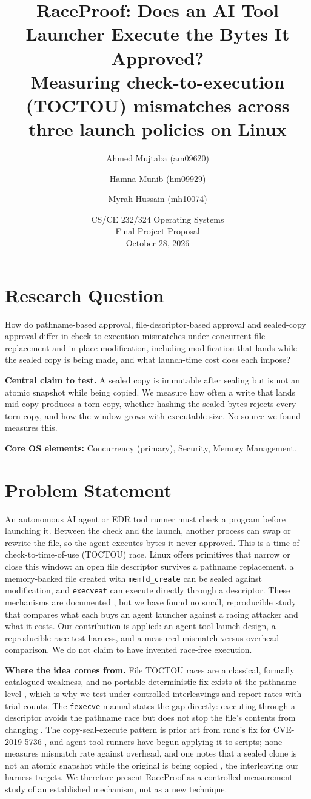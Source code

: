 \documentclass[11pt,a4paper]{article}
\title{\textbf{RaceProof: Does an AI Tool Launcher Execute the Bytes It Approved?}\\
\large Measuring check-to-execution (TOCTOU) mismatches across three launch policies on Linux}
\author{Ahmed Mujtaba (am09620) \and Hamna Munib (hm09929) \and Myrah Hussain (mh10074)}
\date{CS/CE 232/324 Operating Systems \\ Final Project Proposal \\ October 28, 2026}
\begin{document}
\maketitle

\section{Research Question}
How do pathname-based approval, file-descriptor-based approval and sealed-copy approval differ in check-to-execution mismatches under concurrent file replacement and in-place modification, including modification that lands while the sealed copy is being made, and what launch-time cost does each impose?

\textbf{Central claim to test.} A sealed copy is immutable after sealing but is not an atomic snapshot while being copied. We measure how often a write that lands mid-copy produces a torn copy, whether hashing the sealed bytes rejects every torn copy, and how the window grows with executable size. No source we found measures this.

\textbf{Core OS elements:} Concurrency (primary), Security, Memory Management.

\section{Problem Statement}
An autonomous AI agent or EDR tool runner must check a program before launching it. Between the check and the launch, another process can swap or rewrite the file, so the agent executes bytes it never approved. This is a time-of-check-to-time-of-use (TOCTOU) race. Linux offers primitives that narrow or close this window: an open file descriptor survives a pathname replacement, a memory-backed file created with \texttt{memfd\_create} can be sealed against modification, and \texttt{execveat} can execute directly through a descriptor. These mechanisms are documented \cite{memfd,execveat,noexec}, but we have found no small, reproducible study that compares what each buys an agent launcher against a racing attacker and what it costs. Our contribution is applied: an agent-tool launch design, a reproducible race-test harness, and a measured mismatch-versus-overhead comparison. We do not claim to have invented race-free execution.

\textbf{Where the idea comes from.} File TOCTOU races are a classical, formally catalogued weakness, and no portable deterministic fix exists at the pathname level \cite{cwe367,dean04}, which is why we test under controlled interleavings and report rates with trial counts. The \texttt{fexecve} manual states the gap directly: executing through a descriptor avoids the pathname race but does not stop the file's contents from changing \cite{fexecve}. The copy-seal-execute pattern is prior art from runc's fix for CVE-2019-5736 \cite{runc}, and agent tool runners have begun applying it to scripts; none measures mismatch rate against overhead, and one notes that a sealed clone is not an atomic snapshot while the original is being copied \cite{cmpct}, the interleaving our harness targets. We therefore present RaceProof as a controlled measurement study of an established mechanism, not as a new technique.
\end{document}
